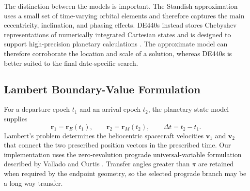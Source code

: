 \documentclass[11pt,a4paper]{article}
\newcommand{\vect}[1]{\bm{#1}}
\begin{document}
The distinction between the models is important. The Standish approximation
uses a small set of time-varying orbital elements and therefore captures the
main eccentricity, inclination, and phasing effects. DE440s instead stores
Chebyshev representations of numerically integrated Cartesian states and is
designed to support high-precision planetary calculations \cite{park2021}.
The approximate model can therefore corroborate the location and scale of a
solution, whereas DE440s is better suited to the final date-specific search.

\subsection{Lambert Boundary-Value Formulation}
\label{sec:lambert-formulation}

For a departure epoch $t_1$ and an arrival epoch $t_2$, the planetary state
model supplies
\begin{equation}
  \vect r_1=\vect r_E(t_1),
  \qquad
  \vect r_2=\vect r_M(t_2),
  \qquad
  \Delta t=t_2-t_1.
\end{equation}
Lambert's problem determines the heliocentric spacecraft velocities
$\vect v_1$ and $\vect v_2$ that connect the two prescribed position vectors in
the prescribed time. Our implementation uses the zero-revolution prograde
universal-variable formulation described by Vallado and Curtis
\cite{vallado2013,curtis2020}. Transfer angles greater than $\pi$ are retained
when required by the endpoint geometry, so the selected prograde branch may be
a long-way transfer.
\end{document}
